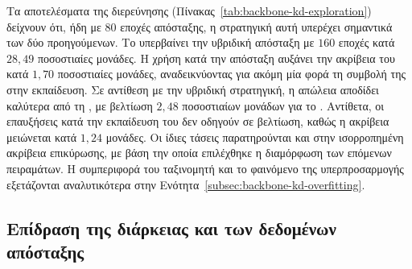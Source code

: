 Τα αποτελέσματα της διερεύνησης
(Πίνακας~\ref{tab:backbone-kd-exploration}) δείχνουν ότι, ήδη με
\(80\) εποχές απόσταξης, η στρατηγική αυτή υπερέχει σημαντικά των δύο
προηγούμενων. Το  υπερβαίνει την υβριδική απόσταξη με
\(160\) εποχές κατά \(28{,}49\) ποσοστιαίες μονάδες. Η χρήση  κατά την απόσταξη αυξάνει
την ακρίβεια του  κατά \(1{,}70\) ποσοστιαίες μονάδες,
αναδεικνύοντας για ακόμη μία φορά τη συμβολή της στην εκπαίδευση. Σε
αντίθεση με την υβριδική στρατηγική, η απώλεια  αποδίδει
καλύτερα από τη , με βελτίωση \(2{,}48\) ποσοστιαίων μονάδων
για το . Αντίθετα, οι επαυξήσεις κατά την εκπαίδευση
του  δεν οδηγούν σε βελτίωση, καθώς η
ακρίβεια μειώνεται κατά \(1{,}24\) μονάδες. Οι ίδιες τάσεις παρατηρούνται και
στην ισορροπημένη ακρίβεια επικύρωσης, με βάση την οποία επιλέχθηκε η
διαμόρφωση των επόμενων πειραμάτων. Η συμπεριφορά του ταξινομητή και το φαινόμενο της
υπερπροσαρμογής εξετάζονται αναλυτικότερα στην
Ενότητα~\ref{subsec:backbone-kd-overfitting}.

\subsection{Επίδραση της διάρκειας και των δεδομένων απόσταξης}
\label{subsec:backbone-kd-epochs-data}

